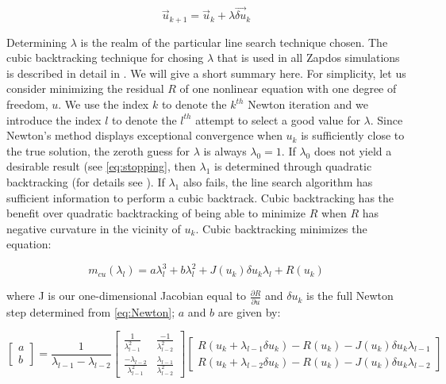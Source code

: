 \begin{equation}
  \vec{u}_{k+1} = \vec{u}_k + \lambda\vec{\delta u}_k
  \label{eq:line_search}
\end{equation}

Determining $\lambda$ is the realm of the particular line search technique chosen. The cubic backtracking technique for chosing $\lambda$ that is used in all Zapdos simulations is described in detail in \cite{dennis1996numerical}. We will give a short summary here. For simplicity, let us consider minimizing the residual $R$ of one nonlinear equation with one degree of freedom, $u$. We use the index $k$ to denote the $k^{th}$ Newton iteration and we introduce the index $l$ to denote the $l^{th}$ attempt to select a good value for $\lambda$. Since Newton's method displays exceptional convergence when $u_k$ is sufficiently close to the true solution, the zeroth guess for $\lambda$ is always $\lambda_0 = 1$. If $\lambda_0$ does not yield a desirable result (see \cref{eq:stopping}, then $\lambda_1$ is determined through quadratic backtracking (for details see \cite{dennis1996numerical}). If $\lambda_1$ also fails, the line search algorithm has sufficient information to perform a cubic backtrack. Cubic backtracking has the benefit over quadratic backtracking of being able to minimize $R$ when $R$ has negative curvature in the vicinity of $u_k$. Cubic backtracking minimizes the equation:

\begin{equation}
  m_{cu}(\lambda_l) = a\lambda_l^3+b\lambda_l^2+J(u_k)\delta u_k\lambda_l+R(u_k)
  \label{eq:bt}
\end{equation}

where J is our one-dimensional Jacobian equal to $\frac{\partial R}{\partial u}$ and $\delta u_k$ is the full Newton step determined from \cref{eq:Newton}; $a$ and $b$ are given by: \cite{dennis1996numerical}

\begin{equation}
  \begin{bmatrix} a \\ b \end{bmatrix} = \frac{1}{\lambda_{l-1}-\lambda_{l-2}} \begin{bmatrix} \frac{1}{\lambda_{l-1}^2} & \frac{-1}{\lambda_{l-2}^2} \\ \frac{-\lambda_{l-2}}{\lambda_{l-1}^2} & \frac{\lambda_{l-1}}{\lambda_{l-2}^2} \end{bmatrix} \begin{bmatrix} R(u_k+\lambda_{l-1}\delta u_k) - R(u_k) - J(u_k)\delta u_k\lambda_{l-1} \\ R(u_k+\lambda_{l-2}\delta u_k) - R(u_k) - J(u_k)\delta u_k\lambda_{l-2} \end{bmatrix}
  \label{eq:dets_bt}
\end{equation}

